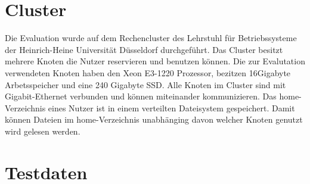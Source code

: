 
\section{Cluster}

Die Evaluation wurde auf dem Rechencluster des Lehrstuhl für Betriebssysteme der Heinrich-Heine Universität Düsseldorf durchgeführt.
Das Cluster besitzt mehrere Knoten die Nutzer reservieren und benutzen können. Die zur Evalutation verwendeten Knoten haben den Xeon E3-1220 Prozessor, bezitzen 16Gigabyte Arbetsspeicher und eine 240 Gigabyte SSD.
Alle Knoten im Cluster sind mit Gigabit-Ethernet verbunden und können miteinander kommunizieren. 
Das home-Verzeichnis eines Nutzer ist in einem verteilten Dateisystem gespeichert. Damit können Dateien im home-Verzeichnis unabhänging davon welcher Knoten genutzt wird gelesen werden.

\section{Testdaten}

